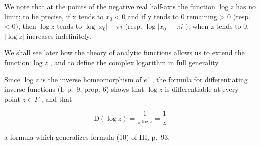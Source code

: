 We note that at the points of the negative real half-axis the function \(\log z\) has no limit; to be precise, if x tends to \(x_{0} < 0\) and if y tends to 0 remaining \textgreater{} 0 (resp. \textless{} 0), then \(\log z\) tends to \(\log |x_{0}| + \pi i\) (resp. \(\log |x_{0}| - \pi i\) ); when z tends to 0, \(|\log z|\) increases indefinitely.

We shall see later how the theory of analytic functions allows us to extend the function \(\log z\) , and to define the complex logarithm in full generality.

Since \(\log z\) is the inverse homeomorphism of \(e^{z}\) , the formula for differentiating inverse functions (I, p.~9, prop. 6) shows that \(\log z\) is differentiable at every point \(z \in F\) , and that

\[
\mathrm{D} (\log z) = \frac {1}{e ^ {\log z}} = \frac {1}{z}\tag{31}
\]

a formula which generalizes formula (10) of III, p.~93.

